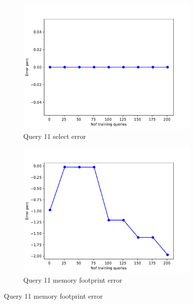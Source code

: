 \begin{figure}[!htb]
  \begin{subfigure}[t]{0.5\textwidth}
    \includegraphics[scale=0.4]{figs/tpch10/tpch10_sel11_error.pdf}
    \caption{Query 11 select error}
    \label{fig:tpch_sel11}
   \end{subfigure}
   \begin{subfigure}[t]{0.5\textwidth}
     \includegraphics[scale=0.4]{figs/tpch10/tpch10_q11_memerror.pdf}
     \caption{Query 11 memory footprint error}
     \label{fig:tpch_mem11}
   \end{subfigure}


\end{figure}
